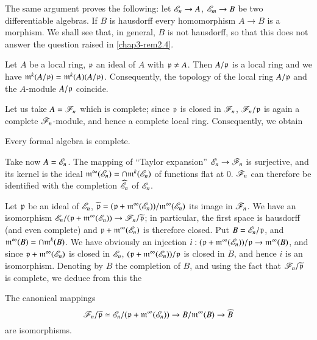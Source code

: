 \begin{remark}\label{chap3-rem3.15}
The same argument proves the following: let $\mathscr{E}_{n}\to A$, $\mathscr{E}_{m}\to B$ be two differentiable algebras. If $B$ is hausdorff every homomorphism $A\to B$ is a morphism. We shall see that, in general, $B$ is not hausdorff, so that this does not answer the question raised in \ref{chap3-rem2.4}.
\end{remark}

Let $A$ be a local ring, $\mathfrak{p}$ an ideal of $A$ with $\mathfrak{p}\neq A$. Then $A/\mathfrak{p}$ is a local ring and we have $\mathfrak{m}^{k}(A/\mathfrak{p})=\mathfrak{m}^{k}(A)(A/\mathfrak{p})$. Consequently, the topology of the local ring $A/\mathfrak{p}$ and the $A$-module $A/\mathfrak{p}$ coincide.

Let us take $A=\mathscr{F}_{n}$ which is complete; since $\mathfrak{p}$ is closed in $\mathscr{F}_{n}$, $\mathscr{F}_{n}/\mathfrak{p}$ is again a complete $\mathscr{F}_{n}$-module, and hence a complete local ring. Consequently, we obtain

\begin{proposition}\label{chap3-prop3.16}
Every formal algebra is complete.
\end{proposition}

Take now $A=\mathscr{E}_{n}$. The mapping of ``Taylor expansion'' $\mathscr{E}_{n}\to \mathscr{F}_{n}$ is surjective, and its kernel is the ideal $\mathfrak{m}^{\infty}(\mathscr{E}_{n})=\cap \mathfrak{m}^{k}(\mathscr{E}_{n})$ of functions flat at $0$. $\mathscr{F}_{n}$ can therefore be identified with the completion $\widehat{\mathscr{E}}_{n}$ of $\mathscr{E}_{n}$.

Let $\mathfrak{p}$ be an ideal of $\mathscr{E}_{n}$, $\widetilde{\mathfrak{p}}=(\mathfrak{p}+\mathfrak{m}^{\infty}(\mathscr{E}_{n}))/\mathfrak{m}^{\infty}(\mathscr{E}_{n})$ its image in $\mathscr{F}_{n}$. We have an isomorphism $\mathscr{E}_{n}/(\mathfrak{p}+\mathfrak{m}^{\infty}(\mathscr{E}_{n}))\to \mathscr{F}_{n}/\widetilde{\mathfrak{p}}$; in particular, the first space is hausdorff (and even complete) and $\mathfrak{p}+\mathfrak{m}^{\infty}(\mathscr{E}_{n})$ is therefore closed. Put $B=\mathscr{E}_{n}/\mathfrak{p}$, and $\mathfrak{m}^{\infty}(B)=\cap \mathfrak{m}^{k}(B)$. We have obviously an injection $i:(\mathfrak{p}+\mathfrak{m}^{\infty}(\mathscr{E}_{n}))/\mathfrak{p}\to \mathfrak{m}^{\infty}(B)$, and since $\mathfrak{p}+\mathfrak{m}^{\infty}(\mathscr{E}_{n})$ is closed in $\mathscr{E}_{n}$, $(\mathfrak{p}+\mathfrak{m}^{\infty}(\mathscr{E}_{n}))/\mathfrak{p}$ is closed in $B$, and hence $i$ is an isomorphism. Denoting by $\widehat{B}$ the completion of $B$, and using the fact that $\mathscr{F}_{n}/\widetilde{\mathfrak{p}}$ is complete, we deduce from this the

\begin{proposition}\label{chap3-prop3.17}
The canonical mappings
$$
\mathscr{F}_{n}/\widetilde{\mathfrak{p}}\simeq \mathscr{E}_{n}/(\mathfrak{p}+\mathfrak{m}^{\infty}(\mathscr{E}_{n}))\to B/\mathfrak{m}^{\infty}(B)\to \widehat{B}
$$
are isomorphisms.
\end{proposition}

